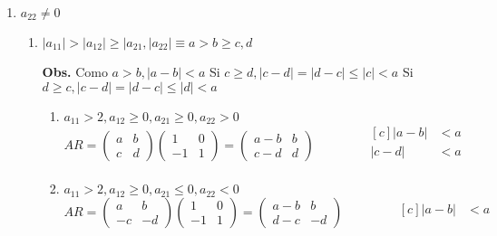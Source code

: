 \documentclass{article}
\newcommand\tab[1][0.6cm]{\hspace*{#1}}
\newcommand\nl{\newline\tab}
\begin{document}
	\begin{enumerate}
		\item $ a_{22} \neq 0$
			\begin{enumerate}
				
			\item \label{1}  
			$|a_{11}| > |a_{12}| \geq |a_{21}, |a_{22}|   \equiv a > b \geq c, d$ \nl
			
			\textbf{Obs.} \nl Como $a > b, |a - b| < a$ \nl
							  Si $c \geq d, |c - d| = |d - c|\leq |c| < a$
							  \nl 
			Si  $d \geq c, |c - d| = |d - c|\leq |d| < a$
			\begin{enumerate}
				\item  $a_{11} > 2, a_{12} \geq 0, a_{21} \geq 0, a_{22} > 0 $\nl
				$$
				AR = 
				\begin{pmatrix}
				a & b \\
				c & d 
				\end{pmatrix} 
				\begin{pmatrix}
				1 & 0 \\
				-1 & 1 
				\end{pmatrix} = 
				\begin{pmatrix}
				a-b & b \\
				c-d & d 
				\end{pmatrix}
				\qquad\qquad
				\begin{aligned}[c]
				|a - b| &< a\\
				|c - d| &< a\\
				\end{aligned}
				$$
				\item $a_{11} > 2, a_{12} \geq 0, a_{21} \leq 0, a_{22} < 0$ \nl
				$$
				AR = 
				\begin{pmatrix}
				a & b \\
				-c & -d 
				\end{pmatrix} 
				\begin{pmatrix}
				1 & 0 \\
				-1 & 1 
				\end{pmatrix} = 
				\begin{pmatrix}
				a-b & b \\
				d-c & -d 
				\end{pmatrix}
				\qquad\qquad
				\begin{aligned}[c]
				|a - b| &< a\\

\end{aligned}$$
\end{enumerate}
\end{enumerate}
\end{enumerate}
\end{document}

